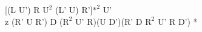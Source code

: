 [(L U') R $\text{U}^2$ (L' U) R']$\text{*}^2$ U'\\
z (R' U R') D ($\text{R}^2$ U' R)(U D')(R' D $\text{R}^2$ U' R D') *\\
